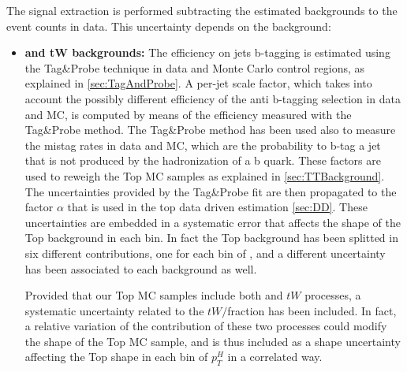 The signal extraction is performed subtracting the estimated backgrounds to the event counts in data.
This uncertainty depends on the background: 
  \begin{itemize}
    \item {\bf\boldmath \ttbar and tW backgrounds:} 
      The efficiency on jets b-tagging is estimated using the Tag\&Probe technique in data
      and Monte Carlo control regions, as explained in \ref{sec:TagAndProbe}. 
      A per-jet scale factor, which takes into account the possibly different efficiency of the anti b-tagging selection in data and MC, 
      is computed by means of the efficiency measured with the Tag\&Probe method.
      The Tag\&Probe method has been used also to measure the mistag rates in data and MC, which are the probability to b-tag a jet that is not produced by the hadronization of a b quark.
      These factors are used to reweigh the Top MC samples as explained in \ref{sec:TTBackground}.\\
      The uncertainties provided by the Tag\&Probe fit are then propagated to the factor $\alpha$ that is used in the top data driven estimation \ref{sec:DD}.
      These uncertainties are embedded in a systematic error that affects the shape of the Top background in each \pth bin. In fact the Top background has been splitted in six different contributions, one for each bin of \pth, and a different uncertainty has been associated to each background as well.
      
      Provided that our Top MC samples include both \ttbar and $tW$ processes, a systematic uncertainty related to the $tW/$\ttbar fraction has been included.
      In fact, a relative variation of the contribution of these two processes could modify the shape of the Top MC sample, and is thus included as a shape uncertainty affecting the Top shape in each bin of $p_T^H$ in a correlated way. 
 

\end{itemize}
